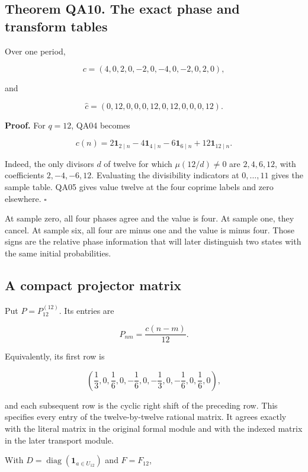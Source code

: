 \hypertarget{q:theorem-qa10.-the-exact-phase-and-transform-tables}{%
\subsection*{Theorem QA10. The exact phase and transform
tables}\label{q:theorem-qa10.-the-exact-phase-and-transform-tables}}

Over one period,

\[
c=(4,0,2,0,-2,0,-4,0,-2,0,2,0),
\]

and

\[
\widehat c=(0,12,0,0,0,12,0,12,0,0,0,12).
\]

\textbf{Proof.} For \(q=12\), QA04 becomes

\[
c(n)=2\mathbf1_{2\mid n}-4\mathbf1_{4\mid n}
-6\mathbf1_{6\mid n}+12\mathbf1_{12\mid n}.
\]

Indeed, the only divisors \(d\) of twelve for which \(\mu(12/d)\ne0\)
are \(2,4,6,12\), with coefficients \(2,-4,-6,12\). Evaluating the
divisibility indicators at \(0,\ldots,11\) gives the sample table. QA05
gives value twelve at the four coprime labels and zero elsewhere.
\(\square\)

At sample zero, all four phases agree and the value is four. At sample
one, they cancel. At sample six, all four are minus one and the value is
minus four. Those signs are the relative phase information that will
later distinguish two states with the same initial probabilities.

\hypertarget{q:a-compact-projector-matrix}{%
\subsection{A compact projector
matrix}\label{q:a-compact-projector-matrix}}

Put \(P=P_{12}^{(12)}\). Its entries are

\[
P_{nm}=\frac{c(n-m)}{12}.
\]

Equivalently, its first row is

\[
\left(\frac13,0,\frac16,0,-\frac16,0,-\frac13,0,-\frac16,0,\frac16,0\right),
\]

and each subsequent row is the cyclic right shift of the preceding row.
This specifies every entry of the twelve-by-twelve rational matrix. It
agrees exactly with the literal matrix in the original formal module and
with the indexed matrix in the later transport module.

With \(D=\operatorname{diag}(\mathbf1_{a\in U_{12}})\) and \(F=F_{12}\),

